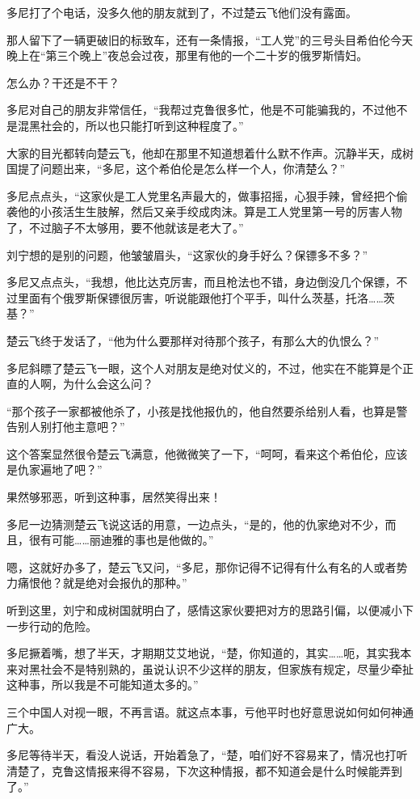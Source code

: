 多尼打了个电话，没多久他的朋友就到了，不过楚云飞他们没有露面。

那人留下了一辆更破旧的标致车，还有一条情报，“工人党”的三号头目希伯伦今天晚上在“第三个晚上”夜总会过夜，那里有他的一个二十岁的俄罗斯情妇。

怎么办？干还是不干？

多尼对自己的朋友非常信任，“我帮过克鲁很多忙，他是不可能骗我的，不过他不是混黑社会的，所以也只能打听到这种程度了。”

大家的目光都转向楚云飞，他却在那里不知道想着什么默不作声。沉静半天，成树国提了问题出来，“多尼，这个希伯伦是怎么样一个人，你清楚么？”

多尼点点头，“这家伙是工人党里名声最大的，做事招摇，心狠手辣，曾经把个偷袭他的小孩活生生肢解，然后又亲手绞成肉沫。算是工人党里第一号的厉害人物了，不过脑子不太够用，要不他就该是老大了。”

刘宁想的是别的问题，他皱皱眉头，“这家伙的身手好么？保镖多不多？”

多尼又点点头，“我想，他比达克厉害，而且枪法也不错，身边倒没几个保镖，不过里面有个俄罗斯保镖很厉害，听说能跟他打个平手，叫什么茨基，托洛……茨基？”

楚云飞终于发话了，“他为什么要那样对待那个孩子，有那么大的仇恨么？”

多尼斜瞟了楚云飞一眼，这个人对朋友是绝对仗义的，不过，他实在不能算是个正直的人啊，为什么会这么问？

“那个孩子一家都被他杀了，小孩是找他报仇的，他自然要杀给别人看，也算是警告别人别打他主意吧？”

这个答案显然很令楚云飞满意，他微微笑了一下，“呵呵，看来这个希伯伦，应该是仇家遍地了吧？”

果然够邪恶，听到这种事，居然笑得出来！

多尼一边猜测楚云飞说这话的用意，一边点头，“是的，他的仇家绝对不少，而且，很有可能……丽迪雅的事也是他做的。”

嗯，这就好办多了，楚云飞又问，“多尼，那你记得不记得有什么有名的人或者势力痛恨他？就是绝对会报仇的那种。”

听到这里，刘宁和成树国就明白了，感情这家伙要把对方的思路引偏，以便减小下一步行动的危险。

多尼撅着嘴，想了半天，才期期艾艾地说，“楚，你知道的，其实……呃，其实我本来对黑社会不是特别熟的，虽说认识不少这样的朋友，但家族有规定，尽量少牵扯这种事，所以我是不可能知道太多的。”

三个中国人对视一眼，不再言语。就这点本事，亏他平时也好意思说如何如何神通广大。

多尼等待半天，看没人说话，开始着急了，“楚，咱们好不容易来了，情况也打听清楚了，克鲁这情报来得不容易，下次这种情报，都不知道会是什么时候能弄到了。”

